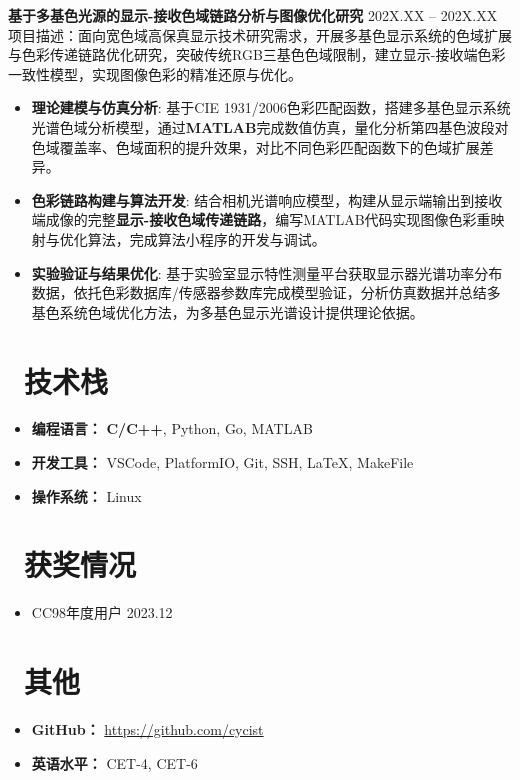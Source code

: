 \documentclass[11pt]{article}
\newlength{\intraProjectTitleSep}
\newcommand{\titlebreak}{\\[\intraProjectTitleSep]}
\newlength{\intraProjectListTopSep}
\begin{document}
\textbf{基于多基色光源的显示-接收色域链路分析与图像优化研究} \hfill 202X.XX -- 202X.XX \titlebreak

项目描述：面向宽色域高保真显示技术研究需求，开展多基色显示系统的色域扩展与色彩传递链路优化研究，突破传统RGB三基色色域限制，建立显示-接收端色彩一致性模型，实现图像色彩的精准还原与优化。

\begin{itemize}[nosep, topsep=\intraProjectListTopSep]
    \item \textbf{理论建模与仿真分析}: 基于CIE 1931/2006色彩匹配函数，搭建多基色显示系统光谱色域分析模型，通过\textbf{MATLAB}完成数值仿真，量化分析第四基色波段对色域覆盖率、色域面积的提升效果，对比不同色彩匹配函数下的色域扩展差异。
    \item \textbf{色彩链路构建与算法开发}: 结合相机光谱响应模型，构建从显示端输出到接收端成像的完整\textbf{显示-接收色域传递链路}，编写MATLAB代码实现图像色彩重映射与优化算法，完成算法小程序的开发与调试。
    \item \textbf{实验验证与结果优化}: 基于实验室显示特性测量平台获取显示器光谱功率分布数据，依托色彩数据库/传感器参数库完成模型验证，分析仿真数据并总结多基色系统色域优化方法，为多基色显示光谱设计提供理论依据。
\end{itemize}

\section{\makebox[\widthof{\faCogs}][c]{\color{CVBlue}\faCogs}\ 技术栈}
\begin{itemize}[nosep]
    \item \textbf{编程语言：} \textbf{C/C++}, Python, Go, MATLAB
    \item \textbf{开发工具：} VSCode, PlatformIO, Git, SSH, LaTeX, MakeFile
    \item \textbf{操作系统：} Linux
\end{itemize}
\section{\makebox[\widthof{\faGraduationCap}][c]{\color{CVBlue}\faList}\ 获奖情况}
\begin{itemize}
    \item CC98年度用户 \hfill 2023.12
    
\end{itemize}
    
\section{\makebox[\widthof{\faInfo}][c]{\color{CVBlue}\faInfo}\ 其他}
\begin{itemize}[parsep=0.5ex]
    \item \textbf{GitHub：} \href{https://github.com/maksymilan}{https://github.com/cycist} 
    \item \textbf{英语水平：} CET-4, CET-6
\end{itemize}
\end{document}

